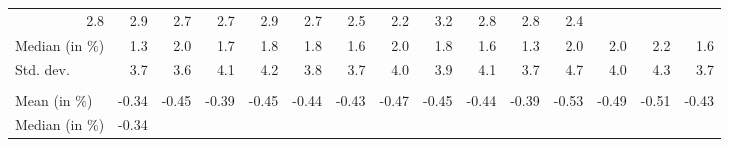 \begin{tabular}{lllllllllllllll}
  \multicolumn{1}{r}{2.8} &
  \multicolumn{1}{r}{2.9} &
  \multicolumn{1}{r}{2.7} &
  \multicolumn{1}{r}{2.7} &
  \multicolumn{1}{r}{2.9} &
  \multicolumn{1}{r}{2.7} &
  \multicolumn{1}{r}{2.5} &
  \multicolumn{1}{r}{2.2} &
  \multicolumn{1}{r}{3.2} &
  \multicolumn{1}{r}{2.8} &
  \multicolumn{1}{r}{2.8} &
  \multicolumn{1}{r}{2.4} \\
\multicolumn{1}{l}{\hspace{2em}Median (in $\%$)} &
  \multicolumn{1}{|r}{1.3} &
  \multicolumn{1}{r}{2.0} &
  \multicolumn{1}{r}{1.7} &
  \multicolumn{1}{r}{1.8} &
  \multicolumn{1}{r}{1.8} &
  \multicolumn{1}{r}{1.6} &
  \multicolumn{1}{r}{2.0} &
  \multicolumn{1}{r}{1.8} &
  \multicolumn{1}{r}{1.6} &
  \multicolumn{1}{r}{1.3} &
  \multicolumn{1}{r}{2.0} &
  \multicolumn{1}{r}{2.0} &
  \multicolumn{1}{r}{2.2} &
  \multicolumn{1}{r}{1.6} \\
\multicolumn{1}{l}{\hspace{2em}Std. dev.} &
  \multicolumn{1}{|r}{3.7} &
  \multicolumn{1}{r}{3.6} &
  \multicolumn{1}{r}{4.1} &
  \multicolumn{1}{r}{4.2} &
  \multicolumn{1}{r}{3.8} &
  \multicolumn{1}{r}{3.7} &
  \multicolumn{1}{r}{4.0} &
  \multicolumn{1}{r}{3.9} &
  \multicolumn{1}{r}{4.1} &
  \multicolumn{1}{r}{3.7} &
  \multicolumn{1}{r}{4.7} &
  \multicolumn{1}{r}{4.0} &
  \multicolumn{1}{r}{4.3} &
  \multicolumn{1}{r}{3.7} \\
\multicolumn{1}{l}{\hspace{1em}{\textit{Elasticity} ($\widehat{\beta}$)}} &
  \multicolumn{1}{|r}{} &
  \multicolumn{1}{r}{} &
  \multicolumn{1}{r}{} &
  \multicolumn{1}{r}{} &
  \multicolumn{1}{r}{} &
  \multicolumn{1}{r}{} &
  \multicolumn{1}{r}{} &
  \multicolumn{1}{r}{} &
  \multicolumn{1}{r}{} &
  \multicolumn{1}{r}{} &
  \multicolumn{1}{r}{} &
  \multicolumn{1}{r}{} &
  \multicolumn{1}{r}{} &
  \multicolumn{1}{r}{} \\
\multicolumn{1}{l}{\hspace{2em}Mean (in $\%$)} &
  \multicolumn{1}{|r}{-0.34} &
  \multicolumn{1}{r}{-0.45} &
  \multicolumn{1}{r}{-0.39} &
  \multicolumn{1}{r}{-0.45} &
  \multicolumn{1}{r}{-0.44} &
  \multicolumn{1}{r}{-0.43} &
  \multicolumn{1}{r}{-0.47} &
  \multicolumn{1}{r}{-0.45} &
  \multicolumn{1}{r}{-0.44} &
  \multicolumn{1}{r}{-0.39} &
  \multicolumn{1}{r}{-0.53} &
  \multicolumn{1}{r}{-0.49} &
  \multicolumn{1}{r}{-0.51} &
  \multicolumn{1}{r}{-0.43} \\
\multicolumn{1}{l}{\hspace{2em}Median (in $\%$)} &
  \multicolumn{1}{|r}{-0.34} &

\end{tabular}
